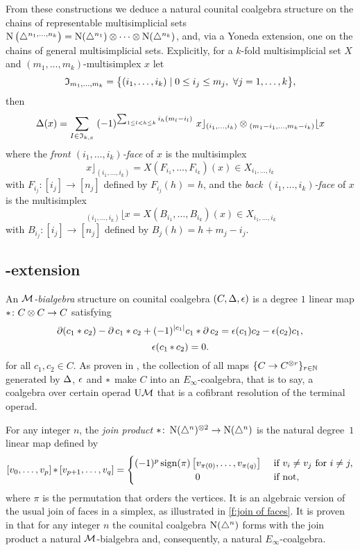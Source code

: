 From these constructions we deduce a natural counital coalgebra structure on the chains of representable multisimplicial sets $\chains \big( \simplex^{n_1, \dots, n_k} \big) = \chains(\simplex^{n_1}) \ot \dotsb \ot \chains(\simplex^{n_k})$, and, via a Yoneda extension, one on the chains of general multisimplicial sets.
Explicitly, for a $k$-fold multisimplicial set $X$ and $(m_1,\dots,m_k)$-multisimplex $x$ let
\[
\fI_{m_1,\dots,m_k} = \set[\big]{(i_{1},\dots,i_{k}) \mid 0 \le i_j \le m_j,\ \forall j = 1,\dots,k},
\]
then
\[
\copr(x) =
\sum_{I\in \mathfrak{I}_{k,x}} \;
(-1)^{\sum_{1 \leq l<h \leq k} i_h (m_l-i_l) } \
x \rfloor_{(i_{1},\dots,i_{k})} \ot
\!\,_{(m_{1}-i_{1}, \dots, m_{k}-i_{k})} \lfloor x
\]
where the \textit{front $(i_1,\dots,i_k)$-face} of $x$ is the multisimplex
\[
x \rfloor_{(i_{1}, \dots, i_{k})} =
X(F_{i_1}, \dots, F_{i_k})(x) \in X_{i_1,\dots,i_k}
\]
with
$F_{i_j} \colon [i_j] \to [n_j]$ defined by $F_{i_j}(h)=h$, and the \textit{back $(i_1,\dots,i_k)$-face} of $x$ is the multisimplex
\[
\,_{(i_{1}, \dots, i_{k})} \lfloor x =
X(B_{i_1}, \dots, B_{i_k})(x) \in X_{i_1,\dots,i_k}
\]
with $B_{i_j} \colon [i_j] \to [n_j]$ defined by $B_j(h) = h+m_j-i_j$.

\subsection{\pdfEinfty-extension} \label{ss:e-infty extension}

An \textit{$\cM$-bialgebra} structure on counital coalgebra $(C, \copr, \aug)$ is a degree $1$ linear map $\pr \colon C \ot C \to C$ satisfying
\[
\bd (c_1 \ast c_2) - \bd c_1 \ast c_2 + (-1)^{\bars{c_1}} c_1 \ast \bd c_2 =
\aug(c_1) c_2 - \aug(c_2) c_1,
\]
\[
\aug (c_1 \pr c_2) = 0.
\]
for all $c_1, c_2 \in C$.
As proven in \cite{medina2020prop1}, the collection of all maps $\set{C \to C^{\ot r}}_{r \in \N}$ generated by $\copr$, $\aug$ and $\pr$ make $C$ into an $E_\infty$-coalgebra, that is to say, a coalgebra over certain operad $\UM$ that is a cofibrant resolution of the terminal operad.

For any integer $n$, the \textit{join product} $\ast \colon \chains(\simplex^n)^{\ot 2} \to \chains(\simplex^n)$ is the natural degree~$1$ linear map defined by
\begin{equation*}
	\left[v_0, \dots, v_p \right] \pr \left[v_{p+1}, \dots, v_q\right] =
	\begin{cases} (-1)^{p} \sign(\pi) \left[v_{\pi(0)}, \dots, v_{\pi(q)}\right] & \text{ if } v_i \neq v_j \text{ for } i \neq j, \\
		\hfil 0 & \text{ if not}, \end{cases}
\end{equation*}
where $\pi$ is the permutation that orders the vertices.
It is an algebraic version of the usual join of faces in a simplex, as illustrated in \cref{f:join of faces}.
It is proven in \cite{medina2020prop1} that for any integer $n$ the counital coalgebra $\chains(\simplex^n)$ forms with the join product a natural $\cM$-bialgebra and, consequently, a natural $E_\infty$-coalgebra.

